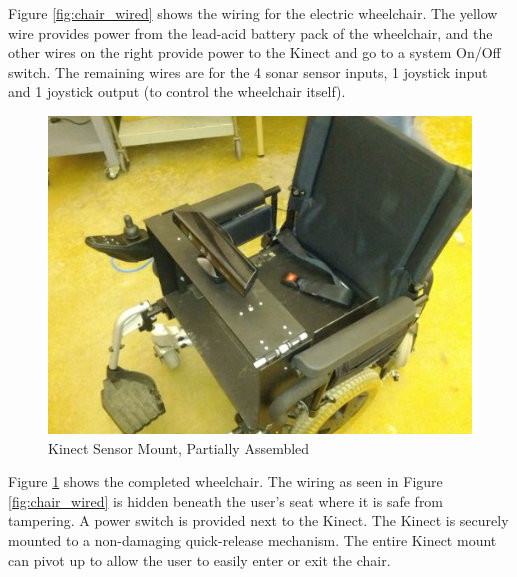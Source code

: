 \documentclass[oneside,final,a4paper]{report}
\begin{document}
Figure \ref{fig:chair_wired} shows the wiring for the electric wheelchair. The yellow wire provides power from the lead-acid battery pack of the wheelchair, and the other wires on the right provide power to the Kinect and go to a system On/Off switch. The remaining wires are for the 4 sonar sensor inputs, 1 joystick input and 1 joystick output (to control the wheelchair itself).

\begin{figure}[hbt]
 \centering
 \includegraphics[scale=0.35]{mech_complete}
 \caption{Kinect Sensor Mount, Partially Assembled}
 \label{fig:mech_complete}
\end{figure}

Figure \ref{fig:mech_complete} shows the completed wheelchair. The wiring as seen in Figure \ref{fig:chair_wired} is hidden beneath the user's seat where it is safe from tampering. A power switch is provided next to the Kinect. The Kinect is securely mounted to a non-damaging quick-release mechanism. The entire Kinect mount can pivot up to allow the user to easily enter or exit the chair.
\end{document}
